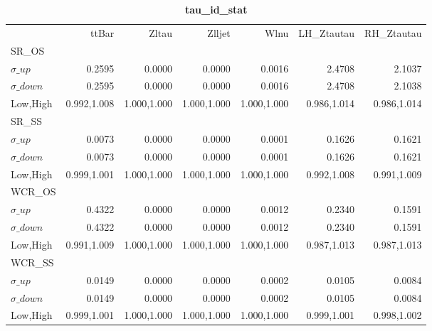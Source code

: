 \documentclass[11pt,oneside,a4paper]{article}
\begin{document}
\begin{table}
\centering
\caption{\bf{tau\_id\_stat}}
\begin{tabular}{lrrrrrr}
& ttBar & Zltau & Zlljet & Wlnu & LH\_Ztautau & RH\_Ztautau \\
SR\_OS &  &  &  &  &  &  \\
$\sigma\_up$ & 0.2595 & 0.0000 & 0.0000 & 0.0016 & 2.4708 & 2.1037 \\
$\sigma\_down$ & 0.2595 & 0.0000 & 0.0000 & 0.0016 & 2.4708 & 2.1038 \\
Low,High & 0.992,1.008 & 1.000,1.000 & 1.000,1.000 & 1.000,1.000 & 0.986,1.014 & 0.986,1.014 \\

\hline
SR\_SS &  &  &  &  &  &  \\
$\sigma\_up$ & 0.0073 & 0.0000 & 0.0000 & 0.0001 & 0.1626 & 0.1621 \\
$\sigma\_down$ & 0.0073 & 0.0000 & 0.0000 & 0.0001 & 0.1626 & 0.1621 \\
Low,High & 0.999,1.001 & 1.000,1.000 & 1.000,1.000 & 1.000,1.000 & 0.992,1.008 & 0.991,1.009 \\

\hline
WCR\_OS &  &  &  &  &  &  \\
$\sigma\_up$ & 0.4322 & 0.0000 & 0.0000 & 0.0012 & 0.2340 & 0.1591 \\
$\sigma\_down$ & 0.4322 & 0.0000 & 0.0000 & 0.0012 & 0.2340 & 0.1591 \\
Low,High & 0.991,1.009 & 1.000,1.000 & 1.000,1.000 & 1.000,1.000 & 0.987,1.013 & 0.987,1.013 \\

\hline
WCR\_SS &  &  &  &  &  &  \\
$\sigma\_up$ & 0.0149 & 0.0000 & 0.0000 & 0.0002 & 0.0105 & 0.0084 \\
$\sigma\_down$ & 0.0149 & 0.0000 & 0.0000 & 0.0002 & 0.0105 & 0.0084 \\
Low,High & 0.999,1.001 & 1.000,1.000 & 1.000,1.000 & 1.000,1.000 & 0.999,1.001 & 0.998,1.002 \\

\hline
\end{tabular}
\end{table}
\end{document}

